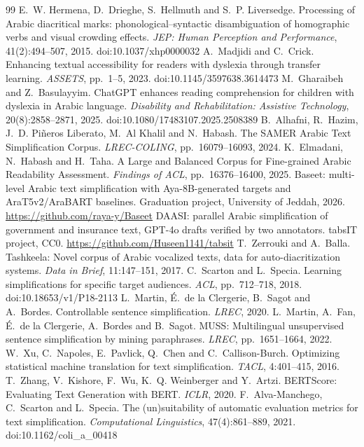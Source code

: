 \documentclass[10pt,a4paper]{article}
\begin{document}
\begin{thebibliography}{99}
 E.~W. Hermena, D.~Drieghe, S.~Hellmuth and S.~P. Liversedge. Processing of Arabic diacritical marks: phonological--syntactic disambiguation of homographic verbs and visual crowding effects. \emph{JEP: Human Perception and Performance}, 41(2):494--507, 2015. doi:10.1037/xhp0000032
 A.~Madjidi and C.~Crick. Enhancing textual accessibility for readers with dyslexia through transfer learning. \emph{ASSETS}, pp.~1--5, 2023. doi:10.1145/3597638.3614473
 M.~Gharaibeh and Z.~Basulayyim. ChatGPT enhances reading comprehension for children with dyslexia in Arabic language. \emph{Disability and Rehabilitation: Assistive Technology}, 20(8):2858--2871, 2025. doi:10.1080/17483107.2025.2508389
 B.~Alhafni, R.~Hazim, J.~D. Piñeros Liberato, M.~Al Khalil and N.~Habash. The SAMER Arabic Text Simplification Corpus. \emph{LREC-COLING}, pp.~16079--16093, 2024.
 K.~Elmadani, N.~Habash and H.~Taha. A Large and Balanced Corpus for Fine-grained Arabic Readability Assessment. \emph{Findings of ACL}, pp.~16376--16400, 2025.
 Baseet: multi-level Arabic text simplification with Aya-8B-generated targets and AraT5v2/AraBART baselines. Graduation project, University of Jeddah, 2026. \url{https://github.com/raya-y/Baseet}
 DAASI: parallel Arabic simplification of government and insurance text, GPT-4o drafts verified by two annotators. tabsIT project, CC0. \url{https://github.com/Huseen1141/tabsit}
 T.~Zerrouki and A.~Balla. Tashkeela: Novel corpus of Arabic vocalized texts, data for auto-diacritization systems. \emph{Data in Brief}, 11:147--151, 2017.
 C.~Scarton and L.~Specia. Learning simplifications for specific target audiences. \emph{ACL}, pp.~712--718, 2018. doi:10.18653/v1/P18-2113
 L.~Martin, É.~de la Clergerie, B.~Sagot and A.~Bordes. Controllable sentence simplification. \emph{LREC}, 2020.
 L.~Martin, A.~Fan, É.~de la Clergerie, A.~Bordes and B.~Sagot. MUSS: Multilingual unsupervised sentence simplification by mining paraphrases. \emph{LREC}, pp.~1651--1664, 2022.
 W.~Xu, C.~Napoles, E.~Pavlick, Q.~Chen and C.~Callison-Burch. Optimizing statistical machine translation for text simplification. \emph{TACL}, 4:401--415, 2016.
 T.~Zhang, V.~Kishore, F.~Wu, K.~Q. Weinberger and Y.~Artzi. BERTScore: Evaluating Text Generation with BERT. \emph{ICLR}, 2020.
 F.~Alva-Manchego, C.~Scarton and L.~Specia. The (un)suitability of automatic evaluation metrics for text simplification. \emph{Computational Linguistics}, 47(4):861--889, 2021. doi:10.1162/coli\_a\_00418

\end{thebibliography}
\end{document}
